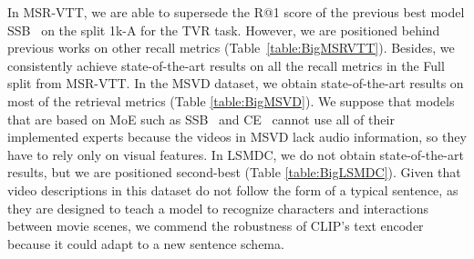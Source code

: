 \documentclass[a4paper,runningheads]{llncs}
\begin{document}
In MSR-VTT,  we are able to supersede the R@1 score of the previous best model SSB~\cite{Patrick2021supportset} on the split 1k-A for the TVR task. However, we are positioned behind previous works on other recall metrics (Table~\ref{table:BigMSRVTT}). Besides, we consistently achieve state-of-the-art results on all the recall metrics in the Full split from MSR-VTT. In the MSVD dataset, we obtain state-of-the-art results on most of the retrieval metrics (Table \ref{table:BigMSVD}). We suppose that models that are based on MoE such as SSB~\cite{Patrick2021supportset} and CE~\cite{Liu2020CE} cannot use all of their implemented experts because the videos in MSVD lack audio information, so they have to rely only on visual features. In LSMDC, we do not obtain state-of-the-art results, but we are positioned second-best (Table \ref{table:BigLSMDC}). Given that video descriptions in this dataset do not follow the form of a typical sentence, as they are designed to teach a model to recognize characters and interactions between movie scenes, we commend the robustness of CLIP's text encoder because it could adapt to a new sentence schema.
\end{document}
